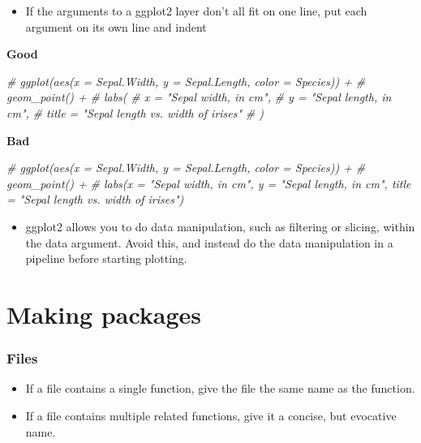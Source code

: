 \documentclass[
]{article}
\newenvironment{Shaded}{\begin{snugshade}}{\end{snugshade}}
\newcommand{\CommentTok}[1]{\textcolor[rgb]{0.56,0.35,0.01}{\textit{#1}}}
\providecommand{\tightlist}{%
  \setlength{\itemsep}{0pt}\setlength{\parskip}{0pt}}
\begin{document}
\begin{itemize}
\tightlist
\item
  If the arguments to a ggplot2 layer don't all fit on one line, put
  each argument on its own line and indent
\end{itemize}

\textbf{Good}

\begin{Shaded}
\begin{Highlighting}[]
\CommentTok{# ggplot(aes(x = Sepal.Width, y = Sepal.Length, color = Species)) +}
\CommentTok{#   geom_point() +}
\CommentTok{#   labs(}
\CommentTok{#     x = "Sepal width, in cm",}
\CommentTok{#     y = "Sepal length, in cm",}
\CommentTok{#     title = "Sepal length vs. width of irises"}
\CommentTok{#   ) }
\end{Highlighting}
\end{Shaded}

\textbf{Bad}

\begin{Shaded}
\begin{Highlighting}[]
\CommentTok{# ggplot(aes(x = Sepal.Width, y = Sepal.Length, color = Species)) +}
\CommentTok{#   geom_point() +}
\CommentTok{#   labs(x = "Sepal width, in cm", y = "Sepal length, in cm", title = "Sepal length vs. width of irises") }
\end{Highlighting}
\end{Shaded}

\begin{itemize}
\tightlist
\item
  ggplot2 allows you to do data manipulation, such as filtering or
  slicing, within the data argument. Avoid this, and instead do the data
  manipulation in a pipeline before starting plotting.
\end{itemize}

\hypertarget{making-packages}{%
\section{Making packages}\label{making-packages}}

\hypertarget{files-1}{%
\subsubsection{Files}\label{files-1}}

\begin{itemize}
\tightlist
\item
  If a file contains a single function, give the file the same name as
  the function.
\item
  If a file contains multiple related functions, give it a concise, but
  evocative name.
\end{itemize}
\end{document}
